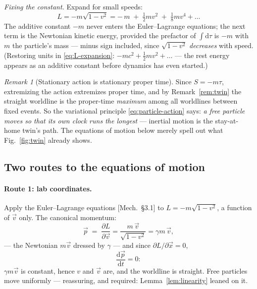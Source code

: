 \documentclass[11pt]{article}
\theoremstyle{plain}
\theoremstyle{definition}
\theoremstyle{remark}
\newtheorem{remark}[theorem]{Remark}
\newcommand{\dd}{\mathrm{d}}
\newcommand{\pd}[2]{\frac{\partial #1}{\partial #2}}
\newcommand{\tot}[2]{\frac{\dd #1}{\dd #2}}
\newcommand{\vx}{\vec{x}}
\newcommand{\vv}{\vec{v}}
\newcommand{\vp}{\vec{p}}
\begin{document}
\emph{Fixing the constant.} Expand for small speeds:
\begin{equation}
  L = -m\sqrt{1 - v^2}
    = -\,m \;+\; \tfrac12 m v^2 \;+\; \tfrac18 m v^4 + \dots
  \label{eq:L-expansion}
\end{equation}
The additive constant $-m$ never enters the Euler--Lagrange equations;
the next term is the Newtonian kinetic energy, provided the prefactor
of $\int\dd\tau$ is $-m$ with $m$ the particle's mass --- minus sign
included, since $\sqrt{1-v^2}$ \emph{decreases} with speed. (Restoring
units in \eqref{eq:L-expansion}: $-mc^2 + \tfrac12 mv^2 + \dots$ ---
the rest energy appears as an additive constant before
dynamics has even started.)

\begin{remark}[Stationary action is stationary proper time]
\label{rem:action-is-proper-time}
Since $S = -m\tau$, extremizing the action extremizes proper time,
and by Remark~\ref{rem:twin} the straight worldline is the proper-time
\emph{maximum} among all worldlines between fixed events. So the
variational principle \eqref{eq:particle-action} says: \emph{a free
particle moves so that its own clock runs the longest} --- inertial
motion is the stay-at-home twin's path. The equations
of motion below merely spell out what Fig.~\ref{fig:twin} already
shows.
\end{remark}

\subsection{Two routes to the equations of motion}
\label{sec:particle-eom}

\paragraph{Route 1: lab coordinates.}
Apply the Euler--Lagrange equations [Mech.\ \S3.1] to
$L = -m\sqrt{1-v^2}$, a function of $\vv$ only. The canonical
momentum:
\begin{equation}
  \vp \;=\; \pd{L}{\vv}
  = \frac{m\,\vv}{\sqrt{1 - v^2}}
  = \gamma m\,\vv,
  \label{eq:canonical-momentum}
\end{equation}
--- the Newtonian $m\vv$ dressed by $\gamma$ --- and since
$\partial L/\partial \vx = 0$,
\begin{equation}
  \tot{\vp}{t} = 0 :
\end{equation}
$\gamma m \vv$ is constant, hence $v$ and $\vv$ are, and the worldline
is straight. Free particles move uniformly --- reassuring, and
required: Lemma~\ref{lem:linearity} leaned on it.
\end{document}
